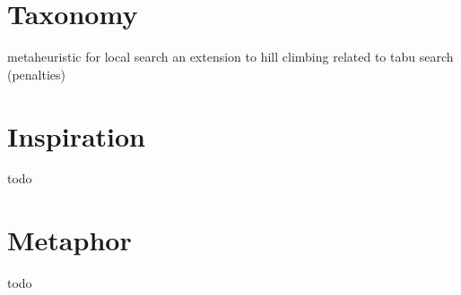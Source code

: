 \documentclass[a4paper, 11pt]{article}
\begin{document}
\section{Taxonomy}
\label{sec:taxonomy}
metaheuristic for local search
an extension to hill climbing
related to tabu search (penalties)

\section{Inspiration}
\label{sec:inspiration}
todo

\section{Metaphor}
\label{sec:metaphor}
todo
\end{document}
